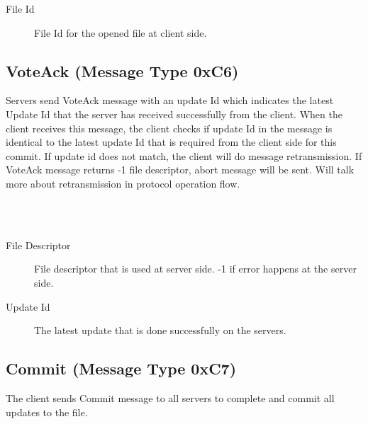 \documentclass[12pt,fleqn]{article}
\begin{document}
\begin{description}
	\item[File Id] File Id for the opened file at client side.
\end{description}

\subsection{VoteAck (Message Type 0xC6)}
Servers send VoteAck message with an update Id which indicates the latest Update Id that the server has received successfully from the client. When the client receives this message, the client checks if update Id in the message is identical to the latest update Id that is required from the client side for this commit. If update id does not match, the client will do message retransmission. If VoteAck message returns -1 file descriptor, abort message will be sent. Will talk more about retransmission in protocol operation flow.

\begin{center}
	\begin{bytefield}[bitwidth=1.1em]{16}
		 \\
		 \\
	\end{bytefield}
\end{center}

\begin{description}
	\item[File Descriptor] File descriptor that is used at server side. -1 if error happens at the server side.
	\item[Update Id] The latest update that is done successfully on the servers.
\end{description}

\subsection{Commit (Message Type 0xC7)}
The client sends Commit message to all servers to complete and commit all updates to the file. 

\begin{center}
	\begin{bytefield}[bitwidth=1.1em]{16}
		 \\
	\end{bytefield}
\end{center}
\end{document}
